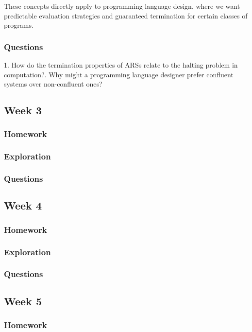 \documentclass{article}
\theoremstyle{theorem}
\theoremstyle{definition}
\theoremstyle{remark}
\begin{document}
    These concepts directly apply to programming language design, where we want predictable evaluation strategies and guaranteed termination for certain classes of programs.
    
    \subsubsection{Questions}
    1. How do the termination properties of ARSs relate to the halting problem in computation?. Why might a programming language designer prefer confluent systems over non-confluent ones?\newline

\subsection{Week 3}
\subsubsection{Homework}
\subsubsection{Exploration}
\subsubsection{Questions}

\subsection{Week 4}
\subsubsection{Homework}
\subsubsection{Exploration}
\subsubsection{Questions}

\subsection{Week 5}
\subsubsection{Homework}
\end{document}
